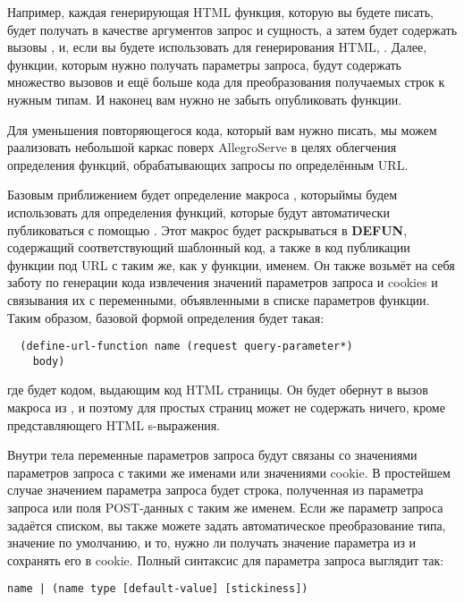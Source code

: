 Например, каждая генерирующая HTML функция, которую вы будете писать, будет получать в
качестве аргументов запрос и сущность, а затем будет содержать вызовы
,  и, если вы будете использовать 
для генерирования HTML, . Далее, функции, которым нужно получать
параметры запроса, будут содержать множество вызовов  и ещё
больше кода для преобразования получаемых строк к нужным типам. И наконец вам нужно не
забыть опубликовать функции.

Для уменьшения повторяющегося кода, который вам нужно писать, мы можем раализовать
небольшой каркас поверх AllegroServe в целях облегчения определения функций,
обрабатывающих запросы по определённым URL.

Базовым приближением будет определение макроса , которыймы будем
использовать для определения функций, которые будут автоматически публиковаться с помощью
. Этот макрос будет раскрываться в \textbf{DEFUN}, содержащий
соответствующий шаблонный код, а также в код публикации функции под URL с таким же, как у
функции, именем. Он также возьмёт на себя заботу по генерации кода извлечения значений
параметров запроса и cookies и связывания их с переменными, объявленными в списке
параметров функции. Таким образом, базовой формой определения 
будет такая:

\begin{lstlisting}
  (define-url-function name (request query-parameter*)
    body)
\end{lstlisting}

\noindent{}где  будет кодом, выдающим код HTML страницы. Он будет обернут в вызов макроса
 из , и поэтому для простых страниц может не содержать ничего, кроме
представляющего HTML s-выражения.

Внутри тела переменные параметров запроса будут связаны со значениями параметров запроса с
такими же именами или значениями cookie. В простейшем случае значением параметра запроса
будет строка, полученная из параметра запроса или поля POST-данных с таким же именем. Если
же параметр запроса задаётся списком, вы также можете задать автоматическое преобразование
типа, значение по умолчанию, и то, нужно ли получать значение параметра из и сохранять его
в cookie. Полный синтаксис для параметра запроса выглядит так:

\begin{lstlisting}[style=lisprepl]
  name | (name type [default-value] [stickiness])
\end{lstlisting}

